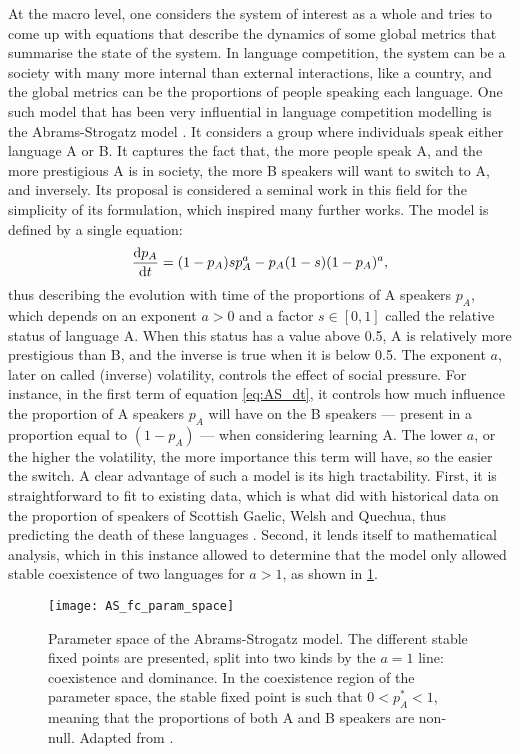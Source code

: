 \documentclass[../thesis.tex]{subfiles}
\begin{document}
At the macro level, one considers the system of interest as a whole and tries to come up
with equations that describe the dynamics of some global metrics that summarise the
state of the system. In language competition, the system can be a society with many more
internal than external interactions, like a country, and the global metrics can be the
proportions of people speaking each language. One such model that has been very
influential in language competition modelling is the Abrams-Strogatz model
\cite{AbramsModellingDynamics2003}. It considers a group where individuals speak either
language A or B. It captures the fact that, the more people speak A, and the more
prestigious A is in society, the more B speakers will want to switch to A, and
inversely. Its proposal is considered a seminal work in this field for the simplicity of
its formulation, which inspired many further works. The model is defined by a single
equation:
\begin{equation}
  \label{eq:AS_dt}
  \dv{p_A}{t} = (1 - p_A) s p_A^a - p_A (1 - s) (1 - p_A)^a,
\end{equation}
thus describing the evolution with time of the proportions of A speakers $p_A$, which
depends on an exponent $a > 0$ and a factor $s \in [0, 1]$ called the relative status of
language A. When this status has a value above 0.5, A is relatively more prestigious
than B, and the inverse is true when it is below 0.5. The exponent $a$, later on called
(inverse) volatility, controls the effect of social pressure. For instance, in the first
term of equation \eqref{eq:AS_dt}, it controls how much influence the proportion of A
speakers $p_A$ will have on the B speakers --- present in a proportion equal to $(1 -
p_A)$ --- when considering learning A. The lower $a$, or the higher the volatility, the
more importance this term will have, so the easier the switch. A clear advantage of such
a model is its high tractability. First, it is straightforward to fit to existing data,
which is what \citeauthor{AbramsModellingDynamics2003} did with historical data on the
proportion of speakers of Scottish Gaelic, Welsh and Quechua, thus predicting the death
of these languages \cite{AbramsModellingDynamics2003}. Second, it lends itself to
mathematical analysis, which in this instance allowed \citeauthor{VazquezAgentBased2010}
to determine that the model only allowed stable coexistence of two languages for $a > 1$, as shown in \cref{fig:AS_fc_param_space}.
\begin{figure}
\centering
  \texttt{[image: AS\_fc\_param\_space]}
  \caption{Parameter space of the Abrams-Strogatz model. The different stable fixed points are presented, split into two kinds by the $a = 1$ line: coexistence and dominance. In the coexistence region of the parameter space, the stable fixed point is such that $0 < p_A^* < 1$, meaning that the proportions of both A and B speakers are non-null. Adapted from \cite{VazquezAgentBased2010}.}
  \label{fig:AS_fc_param_space}
\end{figure}
\end{document}
